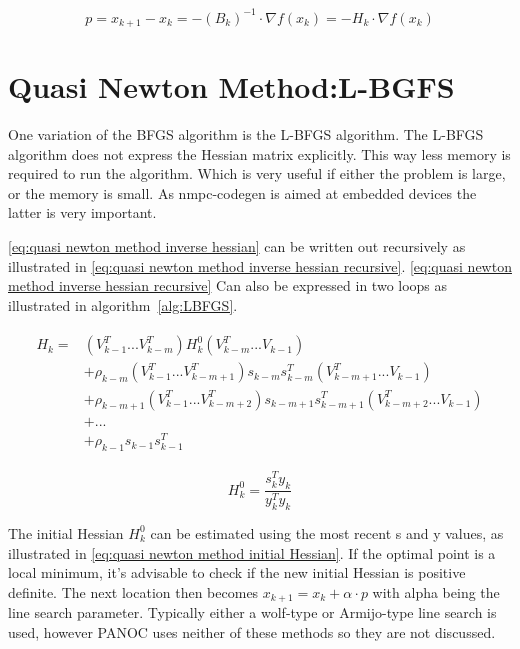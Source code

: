 		\begin{equation}
		p = x_{k+1}-x_k = -(B_k)^{-1} \cdot \nabla f(x_k) = -H_k\cdot \nabla f(x_k)
		\label{eq:quasi newton method}	
		\end{equation}
		
	\section{Quasi Newton Method:L-BGFS}
	One variation of the BFGS algorithm is the L-BFGS algorithm. The L-BFGS algorithm does not express the Hessian matrix explicitly. This way less memory is required to run the algorithm. Which is very useful if either the problem is large, or the memory is small. As nmpc-codegen is aimed at embedded devices the latter is very important.
	
	\eqref{eq:quasi newton method inverse hessian} can be written out recursively as illustrated in \eqref{eq:quasi newton method inverse hessian recursive}. \eqref{eq:quasi newton method inverse hessian recursive} Can also be expressed in two loops as illustrated in algorithm~\ref{alg:LBFGS}.
	
		\begin{eqnarray}	 
			\begin{aligned}
				H_k = 
				& (V^T_{k-1} ... V^T_{k-m})H^0_k(V^T_{k-m} ... V_{k-1}) \\
				& + \rho_{k-m} (V^T_{k-1} ... V^T_{k-m+1})s_{k-m}s_{k-m}^T(V^T_{k-m+1} ... V_{k-1}) \\
				& + \rho_{k-m+1} (V^T_{k-1} ... V^T_{k-m+2})s_{k-m+1}s_{k-m+1}^T(V^T_{k-m+2} ... V_{k-1}) \\
				& + ... \\
				& + \rho_{k-1}s_{k-1}s_{k-1}^T
			\end{aligned}
			\label{eq:quasi newton method inverse hessian recursive}
		\end{eqnarray}
		
		\begin{equation}
			H_k^0 = \frac{s_k^Ty_k}{y_k^Ty_k}
			\label{eq:quasi newton method initial Hessian}
		\end{equation}
		
	The initial Hessian $H^0_k$ can be estimated using the most recent s and y values, as illustrated in \eqref{eq:quasi newton method initial Hessian}. If the optimal point is a local minimum, it's advisable to check if the new initial Hessian is positive definite. The next location then becomes $x_{k+1} = x_{k}+ \alpha \cdot p$ with alpha being the line search parameter. Typically either a wolf-type or Armijo-type line search is used, however PANOC uses neither of these methods so they are not discussed.
	
